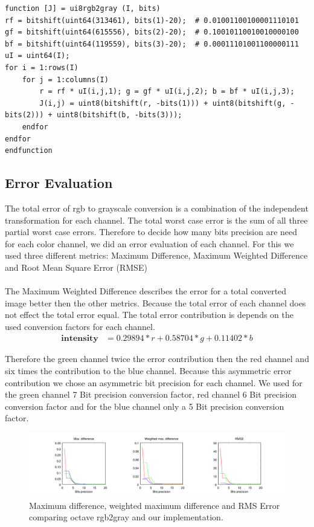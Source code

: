 \documentclass[a4paper]{scrartcl}
\begin{document}
\begin{lstlisting}
function [J] = ui8rgb2gray (I, bits)
rf = bitshift(uint64(313461), bits(1)-20);  # 0.01001100100001110101
gf = bitshift(uint64(615556), bits(2)-20);  # 0.10010110010010000100
bf = bitshift(uint64(119559), bits(3)-20);  # 0.00011101001100000111
uI = uint64(I);
for i = 1:rows(I)
	for j = 1:columns(I)
		r = rf * uI(i,j,1); g = gf * uI(i,j,2); b = bf * uI(i,j,3);
		J(i,j) = uint8(bitshift(r, -bits(1))) + uint8(bitshift(g, -bits(2))) + uint8(bitshift(b, -bits(3)));
	endfor
endfor
endfunction
\end{lstlisting}

    \subsection{Error Evaluation}

	The total error of rgb to grayscale conversion is a combination of the independent transformation for each channel. The total worst case error is the sum of all three partial worst case errors. Therefore to decide how many bits precision are need for each color channel, we did an error evaluation of each channel. For this we used three different metrics: Maximum Difference, Maximum Weighted Difference and Root Mean Square Error (RMSE)

\paragraph{}
The Maximum Weighted Difference describes the error for a total converted image better then the other metrics. Because the total error of each channel does not effect the total error equal. The total error contribution is depends on the used conversion factors for each channel.
\begin{align*}
 \textbf{intensity} &= 0.29894*r + 0.58704*g + 0.11402*b
\end{align*}


Therefore the green channel twice the error contribution then the red channel and six times the contribution to the blue channel. Because this asymmetric error contribution we chose an asymmetric bit precision for each channel. We used for the green channel 7 Bit precision conversion factor, red channel 6 Bit precision conversion factor and for the blue channel only a 5 Bit precision conversion factor.

\begin{figure}[h]
  \centering
  \includegraphics[width=\textwidth]{gray_error} 
  \caption{Maximum difference, weighted maximum difference and RMS Error comparing octave rgb2gray and our implementation.}
\end{figure}
\end{document}
